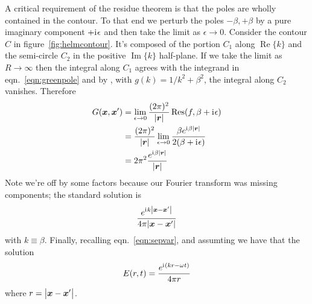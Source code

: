 A critical requirement of the residue theorem is that the poles are wholly contained in the contour.
%
To that end we perturb the poles \(-\beta,+\beta\) by a pure imaginary component \(+\mathrm{i}\mkern1mu \epsilon\) and then take the limit as \(\epsilon \rightarrow 0\).
%
Consider the contour \(C\) in figure~\ref{fig:helmcontour}.
%
It's composed of the portion \(C_1\) along \(\operatorname{Re} \{k\}\) and the semi-circle \(C_2\) in the positive \(\operatorname{Im} \{k\}\) half-plane.
%
If we take the limit as \(R \rightarrow \infty\) then the integral along \(C_1\) agrees with the integrand in eqn.~\eqref{eqn:greenpole} and by , with \(g(k)=1/k^2+\beta^2\), the integral along \(C_2\) vanishes.
%
Therefore
\begin{align}
    G(\bm{x}, \bm{x}') &= \lim_{\epsilon \rightarrow 0}  \frac{(2\pi)^2}{\abs{\bm{r}}} \operatorname {Res} (f, \beta+\mathrm{i}\mkern1mu \epsilon) \\
    &= \frac{(2\pi)^2}{\abs{\bm{r}}} \lim_{\epsilon \rightarrow 0} \frac{\beta e^{\mathrm{i}\mkern1mu \beta \abs{\bm{r}}}}{ 2(\beta + \mathrm{i}\mkern1mu \epsilon) } \\
    &= 2\pi^2\frac{e^{\mathrm{i}\mkern1mu \beta \abs{\bm{r}}}}{\abs{\bm{r}} }
\end{align}
%
Note we're off by some factors because our Fourier transform was missing components; the standard solution is 
%
\begin{equation}
    \frac{e^{\mathrm{i}\mkern1mu k \abs{\bm{x} -\bm{x}'}}}{4 \pi \abs{\bm{x} - \bm{x}'}}
\end{equation}
%
with \(k \equiv \beta\).
%
Finally, recalling eqn.~\eqref{eqn:sepvar}, and assumting we have that the  solution
%
\begin{equation}
    E(r, t) = \frac{e^{\mathrm{i}\mkern1mu (k r - \omega t)}}{4 \pi r} 
\end{equation}
%
where \(r = \abs{\bm{x} - \bm{x}'}\).





